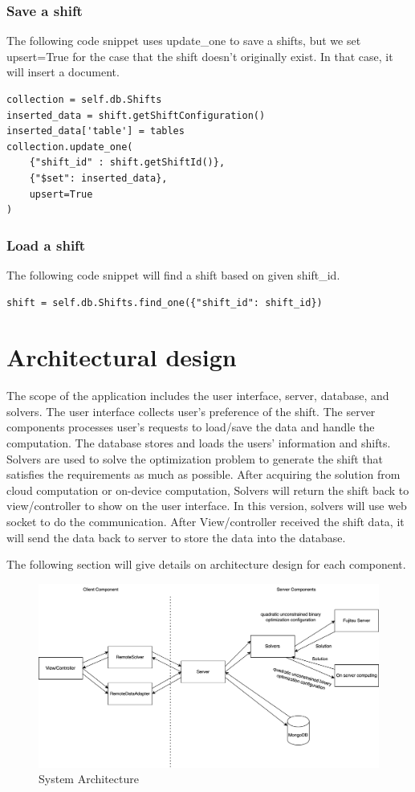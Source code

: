 \documentclass[11pt, oneside]{article}   	%
\begin{document}
\subsubsection{Save a shift}
The following code snippet uses update\_one to save a shifts, but we set upsert=True for the case that the shift doesn't originally exist. In that case, it will insert a document.
\begin{verbatim}
collection = self.db.Shifts
inserted_data = shift.getShiftConfiguration() 
inserted_data['table'] = tables
collection.update_one(
	{"shift_id" : shift.getShiftId()}, 
	{"$set": inserted_data}, 
	upsert=True
)
\end{verbatim}

\subsubsection{Load a shift}
The following code snippet will find a shift based on given shift\_id.
\begin{verbatim}
shift = self.db.Shifts.find_one({"shift_id": shift_id})
\end{verbatim}

\section{Architectural design}
The scope of the application includes the user interface, server, database, and solvers. The user interface collects user's preference of the shift. The server components processes user's requests to load/save the data and handle the computation. The database stores and loads the users' information and shifts. Solvers are used to solve the optimization problem to generate the shift that satisfies the requirements as much as possible. After acquiring the solution from cloud computation or on-device computation, Solvers will return the shift back to view/controller to show on the user interface. In this version, solvers will use web socket to do the communication. After View/controller received the shift data, it will send the data back to server to store the data into the database. 

The following section will give details on architecture design for each component.

\begin{figure}[h]
\centering
\includegraphics[width=\textwidth]{arch1}
\caption{System Architecture}
\label{sysarch}
\end{figure}
\end{document}
